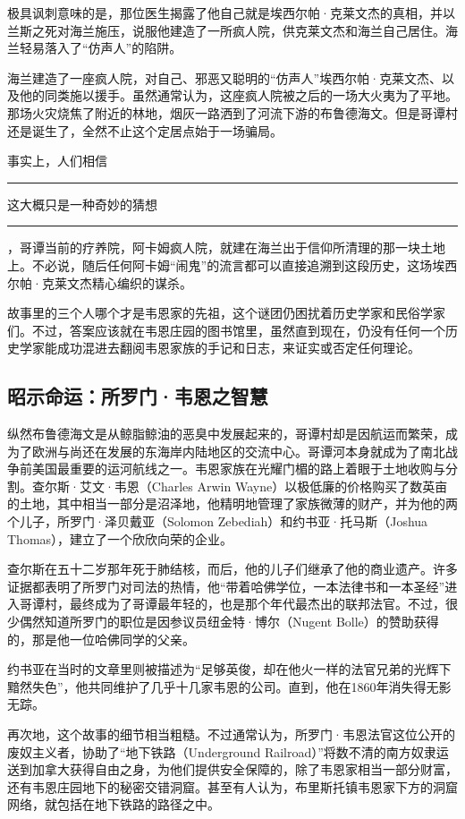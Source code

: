 \documentclass[9pt,openany]{extbook}
\newcommand{\splitdot}{\shusong ·}
\newcommand{\chsline}{\hspace{0.15em}\rule[0.35em]{1.7em}{0.03em}\hspace{0.15em}}
\begin{document}
\begin{multicols}{2}
    极具讽刺意味的是，那位医生揭露了他自己就是埃西尔帕{\splitdot}克莱文杰的真相，并以兰斯之死对海兰施压，说服他建造了一所疯人院，供克莱文杰和海兰自己居住。海兰轻易落入了“仿声人”的陷阱。

    海兰建造了一座疯人院，对自己、邪恶又聪明的“仿声人”埃西尔帕{\splitdot}克莱文杰、以及他的同类施以援手。虽然通常认为，这座疯人院被之后的一场大火夷为了平地。那场火灾烧焦了附近的林地，烟灰一路洒到了河流下游的布鲁德海文。但是哥谭村还是诞生了，全然不止这个定居点始于一场骗局。

    事实上，人们相信{\chsline}这大概只是一种奇妙的猜想{\chsline}，哥谭当前的疗养院，阿卡姆疯人院，就建在海兰出于信仰所清理的那一块土地上。不必说，随后任何阿卡姆“闹鬼”的流言都可以直接追溯到这段历史，这场埃西尔帕{\splitdot}克莱文杰精心编织的谋杀。

    故事里的三个人哪个才是韦恩家的先祖，这个谜团仍困扰着历史学家和民俗学家们。不过，答案应该就在韦恩庄园的图书馆里，虽然直到现在，仍没有任何一个历史学家能成功混进去翻阅韦恩家族的手记和日志，来证实或否定任何理论。

    \subsection{昭示命运：所罗门{\splitdot}韦恩之智慧}

    纵然布鲁德海文是从鲸脂鲸油的恶臭中发展起来的，哥谭村却是因航运而繁荣，成为了欧洲与尚还在发展的东海岸内陆地区的交流中心。哥谭河本身就成为了南北战争前美国最重要的运河航线之一。韦恩家族在光耀门楣的路上着眼于土地收购与分割。查尔斯{\splitdot}艾文{\splitdot}韦恩（Charles Arwin Wayne）以极低廉的价格购买了数英亩的土地，其中相当一部分是沼泽地，他精明地管理了家族微薄的财产，并为他的两个儿子，所罗门{\splitdot}泽贝戴亚（Solomon Zebediah）和约书亚{\splitdot}托马斯（Joshua Thomas），建立了一个欣欣向荣的企业。

    查尔斯在五十二岁那年死于肺结核，而后，他的儿子们继承了他的商业遗产。许多证据都表明了所罗门对司法的热情，他“带着哈佛学位，一本法律书和一本圣经”进入哥谭村，最终成为了哥谭最年轻的，也是那个年代最杰出的联邦法官。不过，很少偶然知道所罗门的职位是因参议员纽金特{\splitdot}博尔（Nugent Bolle）的赞助获得的，那是他一位哈佛同学的父亲。

    约书亚在当时的文章里则被描述为“足够英俊，却在他火一样的法官兄弟的光辉下黯然失色”，他共同维护了几乎十几家韦恩的公司。直到，他在1860年消失得无影无踪。

    再次地，这个故事的细节相当粗糙。不过通常认为，所罗门{\splitdot}韦恩法官这位公开的废奴主义者，协助了“地下铁路（Underground Railroad）”将数不清的南方奴隶运送到加拿大获得自由之身，为他们提供安全保障的，除了韦恩家相当一部分财富，还有韦恩庄园地下的秘密交错洞窟。甚至有人认为，布里斯托镇韦恩家下方的洞窟网络，就包括在地下铁路的路径之中。


\end{multicols}
\end{document}
